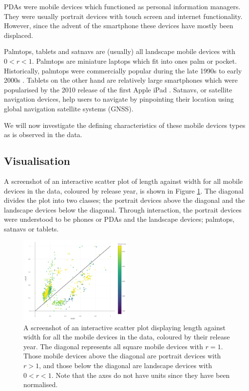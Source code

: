 \documentclass[conference]{IEEEtran}
\begin{document}
PDAs were mobile devices which functioned as personal information managers. They
were usually portrait devices with touch screen and internet functionality.
However, since the advent of the smartphone these devices have mostly been
displaced.

Palmtops, tablets and satnavs are (usually) all landscape mobile devices with $0<r<1$.
Palmtops are miniature laptops which fit into ones palm or pocket. Historically,
palmtops were commercially popular during the late 1990s to early 2000s
\cite{palm}.
Tablets on the other hand are relatively large smartphones which were
popularised by the 2010 release of the first Apple iPad \cite{ipad}.
Satnavs, or satellite navigation devices, help users to navigate by pinpointing
their location using global navigation satellite systems (GNSS).

We will now investigate the defining characteristics of these mobile
devices types as is observed in the data.

\subsection{Visualisation} \label{sec:Avisu}

A screenshot of an interactive scatter plot of length against width for all
mobile devices in the data, coloured by release year, is shown in Figure
\ref{fig:length-width-cyear-shot}. The diagonal divides the plot into two
classes; the portrait devices above the diagonal and the landscape devices
below the diagonal.
Through interaction, the portrait devices were understood
to be phones or PDAs and the landscape devices; palmtops, satnavs or tablets.

\begin{figure}
    \centering
    \includegraphics[width=0.5\textwidth]{../Visualisations/A/length-width-cyear-shot.png}
	\caption{\label{fig:length-width-cyear-shot}A screenshot of an
	interactive scatter plot displaying length against width for all the
	mobile devices in the data, coloured by their release year. The diagonal
	represents all square mobile devices with $r=1$. Those mobile devices
	above the diagonal are portrait devices with $r>1$, and those below the
	diagonal are landscape devices with $0<r<1$. Note that the axes do not
	have units since they have been normalised.}
\end{figure}
\end{document}
